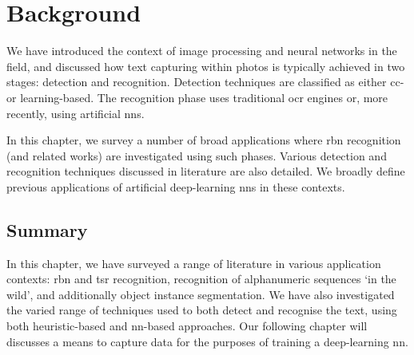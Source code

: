\chapter{Background}
\label{ch:background}


We have introduced the context of image processing and neural networks in the field, and discussed how text capturing within photos is typically achieved in two stages: detection and recognition. Detection techniques are classified as either \gls{cc}- or learning-based. The recognition phase uses traditional \gls{ocr} engines or, more recently, using artificial \glspl{nn}. 

In this chapter, we survey a number of broad applications where \gls{rbn} recognition (and related works) are investigated using such phases. Various detection and recognition techniques discussed in literature are also detailed. We broadly define previous applications of artificial deep-learning \glspl{nn} in these contexts.





\section*{Summary}

In this chapter, we have surveyed a range of literature in various application contexts: \gls{rbn} and \gls{tsr} recognition, recognition of alphanumeric sequences `in the wild', and additionally object instance segmentation. We have also investigated the varied range of techniques used to both detect and recognise the text, using both heuristic-based and \gls{nn}-based approaches. Our following chapter will discusses a means to capture data for the purposes of training a deep-learning \gls{nn}. 